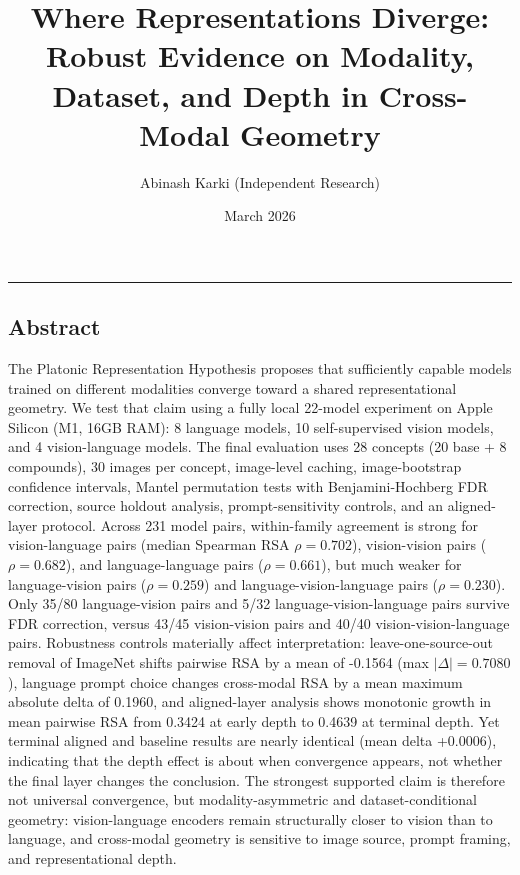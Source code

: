 \documentclass[
]{article}
\title{Where Representations Diverge: Robust Evidence on Modality,
Dataset, and Depth in Cross-Modal Geometry}
\author{Abinash Karki (Independent Research)}
\date{March 2026}
\begin{document}
\maketitle

\begin{center}\rule{0.5\linewidth}{0.5pt}\end{center}

\subsection{Abstract}\label{abstract}

The Platonic Representation Hypothesis proposes that sufficiently
capable models trained on different modalities converge toward a shared
representational geometry. We test that claim using a fully local
22-model experiment on Apple Silicon (M1, 16GB RAM): 8 language models,
10 self-supervised vision models, and 4 vision-language models. The
final evaluation uses 28 concepts (20 base + 8 compounds), 30 images per
concept, image-level caching, image-bootstrap confidence intervals,
Mantel permutation tests with Benjamini-Hochberg FDR correction, source
holdout analysis, prompt-sensitivity controls, and an aligned-layer
protocol. Across 231 model pairs, within-family agreement is strong for
vision-language pairs (median Spearman RSA \(\rho = 0.702\)),
vision-vision pairs (\(\rho = 0.682\)), and language-language pairs
(\(\rho = 0.661\)), but much weaker for language-vision pairs
(\(\rho = 0.259\)) and language-vision-language pairs
(\(\rho = 0.230\)). Only 35/80 language-vision pairs and 5/32
language-vision-language pairs survive FDR correction, versus 43/45
vision-vision pairs and 40/40 vision-vision-language pairs. Robustness
controls materially affect interpretation: leave-one-source-out removal
of ImageNet shifts pairwise RSA by a mean of -0.1564 (max
\(|\Delta| = 0.7080\)), language prompt choice changes cross-modal RSA
by a mean maximum absolute delta of 0.1960, and aligned-layer analysis
shows monotonic growth in mean pairwise RSA from 0.3424 at early depth
to 0.4639 at terminal depth. Yet terminal aligned and baseline results
are nearly identical (mean delta +0.0006), indicating that the depth
effect is about when convergence appears, not whether the final layer
changes the conclusion. The strongest supported claim is therefore not
universal convergence, but modality-asymmetric and dataset-conditional
geometry: vision-language encoders remain structurally closer to vision
than to language, and cross-modal geometry is sensitive to image source,
prompt framing, and representational depth.
\end{document}
